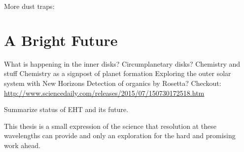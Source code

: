 More dust traps: \citep{espaillat15}

\section{A Bright Future}
What is happening in the inner disks? \citep{ke14}
Circumplanetary disks? \citep{perez15}
Chemistry and stuff \citep{oberg15} \citep{graninger15} 
Chemistry as a signpost of planet formation \citep{cleeves15}
Exploring the outer solar system with New Horizons
Detection of organics by Rosetta? Checkout: \url{http://www.sciencedaily.com/releases/2015/07/150730172518.htm}

Summarize status of EHT and its future.

This thesis is a small expression of 
the science that resolution at these wavelengths can provide and only an exploration for the 
hard and promising work ahead.  



